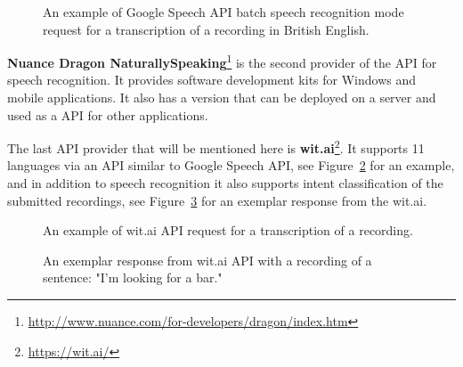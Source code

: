 \begin{figure}[h]
  

  \caption{An example of Google Speech API batch speech recognition mode request for a transcription of a recording in British English.}
  \label{fig:google-api}
\end{figure}


\textbf{Nuance Dragon NaturallySpeaking}\footnote{\url{http://www.nuance.com/for-developers/dragon/index.htm}}
  is the second provider of the API for speech recognition.
It provides software development kits for Windows and mobile applications.
It also has a version that can be deployed on a server and used as a API for other applications.

The last API provider that will be mentioned here is \textbf{wit.ai}\footnote{\url{https://wit.ai/}}.
It supports 11 languages via an API similar to Google Speech API, see Figure~\ref{fig:wit-ai-request} for an example,
  and in addition to speech recognition it also supports intent classification of the submitted recordings,
  see Figure~\ref{fig:wit-ai-response} for an exemplar response from the wit.ai.

\begin{figure}[h]
  

  \caption{An example of wit.ai API request for a transcription of a recording.}
  \label{fig:wit-ai-request}
\end{figure}

\begin{figure}[h]
  

  \caption{An exemplar response from wit.ai API with a recording of a sentence: "I'm looking for a bar."}
  \label{fig:wit-ai-response}
  \vspace*{6in}
\end{figure}

